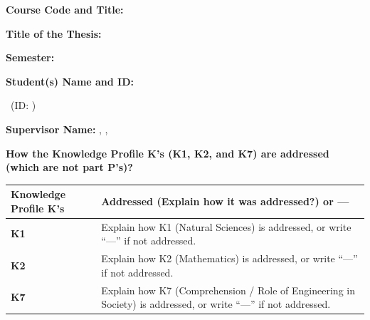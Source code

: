 \begin{onehalfspace}
\noindent
\textbf{Course Code and Title:} \courseCodeTitle\par\vspace{4pt}
\noindent
\textbf{Title of the Thesis:} \thesisTitle\par\vspace{4pt}
\noindent
\textbf{Semester:} \submissionSemester\par\vspace{4pt}
\noindent
\textbf{Student(s) Name and ID:}\par
\authorA\ (ID: \authorAID)\par
{}\vspace{4pt}
\noindent
\textbf{Supervisor Name:} \supervisorName, \supervisorDesignation, \deptName

\vspace{12pt}

\noindent
\textbf{How the Knowledge Profile K's (K1, K2, and K7) are addressed (which are not part P's)?}\par\vspace{4pt}
\begin{xltabular}{\textwidth}{|>{\raggedright\arraybackslash}p{3.5cm}|>{\raggedright\arraybackslash}X|}
  \hline
  \textbf{Knowledge Profile K's} & \textbf{Addressed (Explain how it was addressed?) or ---} \\
  \hline
  \endhead
  \textbf{K1} & Explain how K1 (Natural Sciences) is addressed, or write ``---'' if not addressed. \\
  \hline
  \textbf{K2} & Explain how K2 (Mathematics) is addressed, or write ``---'' if not addressed. \\
  \hline
  \textbf{K7} & Explain how K7 (Comprehension / Role of Engineering in Society) is addressed, or write ``---'' if not addressed. \\
  \hline
\end{xltabular}

\clearpage


\end{onehalfspace}
